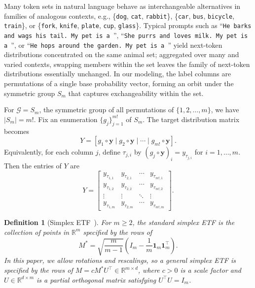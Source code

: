 \documentclass[11pt]{article}
\newtheorem{definition}{Definition}
\begin{document}
Many token sets in natural language behave as interchangeable alternatives in families of analogous contexts, e.g., \{\texttt{dog}, \texttt{cat}, \texttt{rabbit}\}, \{\texttt{car}, \texttt{bus}, \texttt{bicycle}, \texttt{train}\}, or \{\texttt{fork}, \texttt{knife}, \texttt{plate}, \texttt{cup}, \texttt{glass}\}. Typical prompts such as ``\texttt{He barks and wags his tail. My pet is a \textvisiblespace}'', ``\texttt{She purrs and loves milk. My pet is a \textvisiblespace}'', or ``\texttt{He hops around the garden. My pet is a \textvisiblespace}'' yield next-token distributions concentrated on the same animal set; aggregated over many and varied contexts, swapping members within the set leaves the family of next-token distributions essentially unchanged. In our modeling, the label columns are permutations of a single base probability vector, forming an orbit under the symmetric group \(S_m\) that captures exchangeability within the set.

For \( \mathcal G = S_m \), the symmetric group of all permutations of \( \{1, 2, \dots, m\} \), we have \( |S_m| = m! \). Fix an enumeration \(\{g_j\}_{j=1}^{m!}\) of \(S_m\). The target distribution matrix becomes
\[
Y=[g_1\circ\boldsymbol{y}\mid g_2\circ\boldsymbol{y}\mid\cdots\mid g_{m!}\circ\boldsymbol{y}].
\]
Equivalently, for each column \(j\), define \(\tau_{j,i}\) by \((g_j\circ\boldsymbol{y})_i=y_{\tau_{j,i}}\) for \(i=1,\ldots,m\). Then the entries of \(Y\) are
\[
Y = \begin{bmatrix}
y_{\tau_{1,1}} & y_{\tau_{2,1}} & \cdots & y_{\tau_{m!,1}} \\
y_{\tau_{1,2}} & y_{\tau_{2,2}} & \cdots & y_{\tau_{m!,2}} \\
\vdots & \vdots & \ddots & \vdots \\
y_{\tau_{1,m}} & y_{\tau_{2,m}} & \cdots & y_{\tau_{m!,m}}
\end{bmatrix}.
\]

\begin{definition}[Simplex ETF~\citep{papyan2020prevalence}]
For \(m\ge 2\), the standard simplex ETF is the collection of points in \(\mathbb{R}^m\) specified by the rows of
\begin{equation}
\label{eq:simplex-etf-mstar}
M^*=\sqrt{\frac{m}{m-1}}\left(I_m-\frac{1}{m}\boldsymbol{1}_m\boldsymbol{1}_m^\top\right).
\end{equation}
In this paper, we allow rotations and rescalings, so a general simplex ETF is specified by the rows of \(M=c M^* U^\top\in\mathbb{R}^{m\times d}\), where \(c>0\) is a scale factor and \(U\in\mathbb{R}^{d\times m}\) is a partial orthogonal matrix satisfying \(U^\top U=I_m\).
\end{definition}
\end{document}
